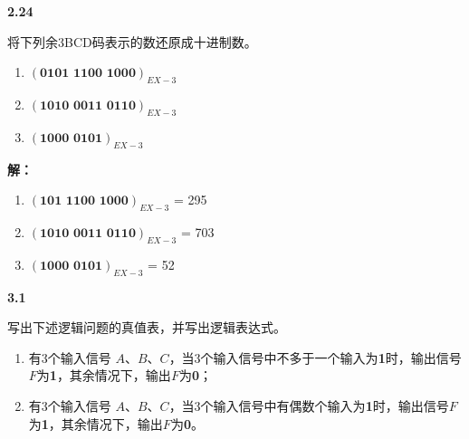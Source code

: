 \documentclass[10pt, a4paper]{article}
\newcommand{\question}[2]{
    \vspace{2ex}\noindent\textbf{#1}\ {\kaishu #2} \par\vspace{1ex}
}
\newcommand{\solution}[1]{
    \noindent\textbf{解：}{\songti #1} \par\vspace{3ex}
}
\begin{document}
\question{2.24}{
将下列余3BCD码表示的数还原成十进制数。
\begin{enumerate}
	\item $ (\textbf{0101 1100 1000})_{EX-3} $
	\item $ (\textbf{1010 0011 0110})_{EX-3} $
	\item $ (\textbf{1000 0101})_{EX-3} $
\end{enumerate}
}

\solution{
\begin{enumerate}
	\item $ (\textbf{101 1100 1000})_{EX-3} $ = 295
	\item $ (\textbf{1010 0011 0110})_{EX-3} $ = 703
	\item $ (\textbf{1000 0101})_{EX-3} $ = 52
\end{enumerate}
}

\question{3.1}{
写出下述逻辑问题的真值表，并写出逻辑表达式。
\begin{enumerate}
	\item 有3个输入信号 $A$、$B$、$C$，当3个输入信号中不多于一个输入为\textbf{1}时，输出信号$F$为\textbf{1}，其余情况下，输出$F$为\textbf{0}；
	\item 有3个输入信号 $A$、$B$、$C$，当3个输入信号中有偶数个输入为\textbf{1}时，输出信号$F$为\textbf{1}，其余情况下，输出$F$为\textbf{0}。
\end{enumerate}
}
\end{document}
